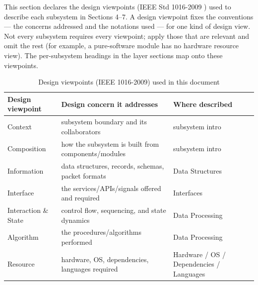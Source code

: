 This section declares the design viewpoints (IEEE Std 1016-2009 \cite{IEEE1016}) used to describe each subsystem in Sections 4--7. A design viewpoint fixes the conventions --- the concerns addressed and the notations used --- for one kind of design view. Not every subsystem requires every viewpoint; apply those that are relevant and omit the rest (for example, a pure-software module has no hardware resource view). The per-subsystem headings in the layer sections map onto these viewpoints.

\begin{table}[H]
\caption{Design viewpoints (IEEE 1016-2009) used in this document}
\begin{center}
    \begin{tabular}{ | p{3.2cm} | p{6.8cm} | p{3cm} |}
    \hline
    \textbf{Design viewpoint} & \textbf{Design concern it addresses} & \textbf{Where described} \\ \hline
    Context & subsystem boundary and its collaborators & subsystem intro \\ \hline
    Composition & how the subsystem is built from components/modules & subsystem intro \\ \hline
    Information & data structures, records, schemas, packet formats & Data Structures \\ \hline
    Interface & the services/APIs/signals offered and required & Interfaces \\ \hline
    Interaction \& State & control flow, sequencing, and state dynamics & Data Processing \\ \hline
    Algorithm & the procedures/algorithms performed & Data Processing \\ \hline
    Resource & hardware, OS, dependencies, languages required & Hardware / OS / Dependencies / Languages \\ \hline
    \end{tabular}
\end{center}
\end{table}
